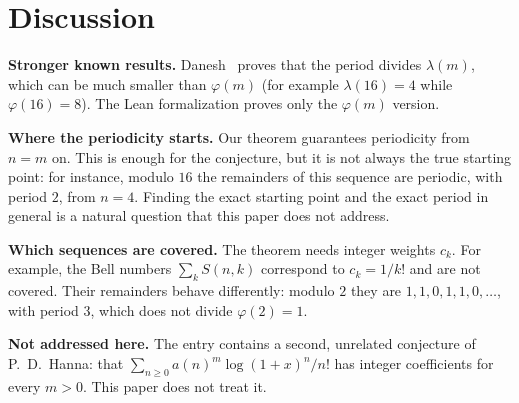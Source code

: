 \documentclass[11pt,a4paper]{article}
\theoremstyle{definition}
\theoremstyle{remark}
\newcommand{\para}[1]{\par\medskip\noindent\textbf{#1}\enspace}
\begin{document}
\section{Discussion}\label{sec:discussion}

\para{Stronger known results.} Danesh~\cite{danesh} proves that the period divides $\lambda(m)$, which can be much smaller
than $\varphi(m)$ (for example $\lambda(16)=4$ while $\varphi(16)=8$). The Lean formalization proves only the
$\varphi(m)$ version.

\para{Where the periodicity starts.} Our theorem guarantees periodicity from $n=m$ on. This is enough for the conjecture,
but it is not always the true starting point: for instance, modulo $16$ the remainders of this sequence are periodic, with period $2$, from $n=4$. Finding the exact starting point and the
exact period in general is a natural question that this paper does not address.

\para{Which sequences are covered.} The theorem needs integer weights $c_k$. For example, the Bell numbers
$\sum_kS(n,k)$ correspond to $c_k=1/k!$ and are not covered. Their remainders behave differently: modulo $2$ they are
$1,1,0,1,1,0,\dots$, with period $3$, which does not divide $\varphi(2)=1$.

\para{Not addressed here.} The entry contains a second, unrelated conjecture of P.~D.~Hanna: that
$\sum_{n\ge0}a(n)^m\log(1+x)^n/n!$ has integer coefficients for every $m>0$. This paper does not treat it.
\end{document}
